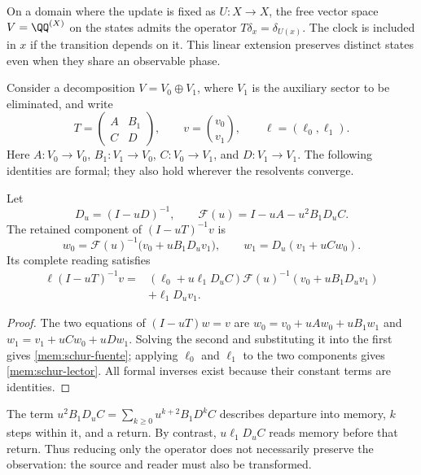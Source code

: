 On a domain where the update is fixed as \(U:X\to X\),
the free vector space \(V=\QQ^{(X)}\) on the states admits the operator
\(T\delta_x=\delta_{U(x)}\). The clock is included in \(x\) if
the transition depends on it. This linear extension preserves distinct
states even when they share an observable phase.

Consider a decomposition \(V=V_0\oplus V_1\), where \(V_1\)
is the auxiliary sector to be eliminated, and write
\[
 T=\begin{pmatrix}A&B_1\\C&D\end{pmatrix},\qquad
 v=\binom{v_0}{v_1},\qquad \ell=(\ell_0,\ell_1).
\]
Here \(A:V_0\to V_0\), \(B_1:V_1\to V_0\),
\(C:V_0\to V_1\), and \(D:V_1\to V_1\).
The following identities are formal; they also hold wherever the
resolvents converge.

\begin{proposition}
\label{mem:prop-schur}
Let
\[
 D_u=(I-uD)^{-1},\qquad
 \mathscr F(u)=I-uA-u^2B_1D_uC.
\]
The retained component of \((I-uT)^{-1}v\) is
\begin{equation}
 w_0=\mathscr F(u)^{-1}\bigl(v_0+uB_1D_uv_1\bigr),
 \qquad w_1=D_u(v_1+uCw_0).
 \label{mem:schur-fuente}
\end{equation}
Its complete reading satisfies
\begin{equation}
 \begin{split}
 \ell(I-uT)^{-1}v
 ={}&(\ell_0+u\ell_1D_uC)
       \mathscr F(u)^{-1}(v_0+uB_1D_uv_1)\\
    &+\ell_1D_uv_1.
 \end{split}
 \label{mem:schur-lector}
\end{equation}
\end{proposition}
\begin{proof}
The two equations of \((I-uT)w=v\) are
\(w_0=v_0+uAw_0+uB_1w_1\) and
\(w_1=v_1+uCw_0+uDw_1\).
Solving the second and substituting it into the first gives
\eqref{mem:schur-fuente}; applying \(\ell_0\) and \(\ell_1\)
to the two components gives \eqref{mem:schur-lector}.
All formal inverses exist because their constant terms are identities.
\end{proof}

The term \(u^2B_1D_uC=\sum_{k\geq0}u^{k+2}B_1D^kC\)
describes departure into memory, \(k\) steps within it, and a return.
By contrast, \(u\ell_1D_uC\) reads memory before that return.
Thus reducing only the operator does not necessarily preserve the
observation: the source and reader must also be transformed.

